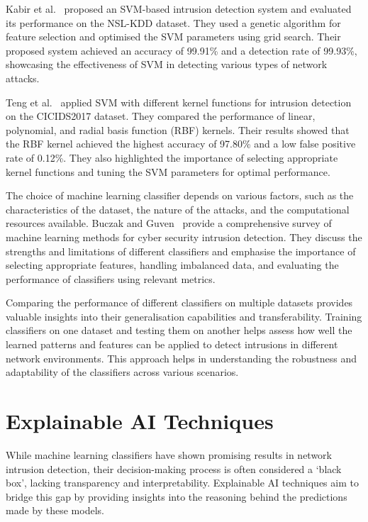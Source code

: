Kabir et al.~\cite{kabir2017network} proposed an SVM-based intrusion detection system and evaluated its performance on the NSL-KDD dataset. They used a genetic algorithm for feature selection and optimised the SVM parameters using grid search. Their proposed system achieved an accuracy of 99.91\% and a detection rate of 99.93\%, showcasing the effectiveness of SVM in detecting various types of network attacks.

Teng et al.~\cite{teng2017svm} applied SVM with different kernel functions for intrusion detection on the CICIDS2017 dataset. They compared the performance of linear, polynomial, and radial basis function (RBF) kernels. Their results showed that the RBF kernel achieved the highest accuracy of 97.80\% and a low false positive rate of 0.12\%. They also highlighted the importance of selecting appropriate kernel functions and tuning the SVM parameters for optimal performance.

The choice of machine learning classifier depends on various factors, such as the characteristics of the dataset, the nature of the attacks, and the computational resources available. Buczak and Guven~\cite{buczak2015survey} provide a comprehensive survey of machine learning methods for cyber security intrusion detection. They discuss the strengths and limitations of different classifiers and emphasise the importance of selecting appropriate features, handling imbalanced data, and evaluating the performance of classifiers using relevant metrics.

Comparing the performance of different classifiers on multiple datasets provides valuable insights into their generalisation capabilities and transferability. Training classifiers on one dataset and testing them on another helps assess how well the learned patterns and features can be applied to detect intrusions in different network environments. This approach helps in understanding the robustness and adaptability of the classifiers across various scenarios.

\section{Explainable AI Techniques}\label{sec:explainable}

While machine learning classifiers have shown promising results in network intrusion detection, their decision-making process is often considered a `black box', lacking transparency and interpretability. Explainable AI techniques aim to bridge this gap by providing insights into the reasoning behind the predictions made by these models.

